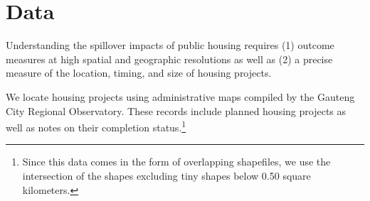 \documentclass[12pt]{article}
\begin{document}

\section{Data}\label{section:data}

Understanding the spillover impacts of public housing requires (1) outcome measures at high spatial and geographic resolutions as well as (2) a precise measure of the location, timing, and size of housing projects.  


We locate housing projects using administrative maps compiled by the Gauteng City Regional Observatory.  These records include planned housing projects as well as notes on their completion status.\footnote{Since this data comes in the form of overlapping shapefiles, we use the intersection of the shapes excluding tiny shapes below 0.50 square kilometers.}  
\end{document}
